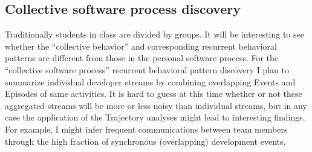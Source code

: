 \subsection{Collective software process discovery}
Traditionally students in class are divided by groups. It will be interesting to see whether the ``collective behavior'' and corresponding recurrent behavioral patterns are different from those in the personal software process. For the ``collective software process'' recurrent behavioral pattern discovery I plan to summarize individual developer streams by combining overlapping Events and Episodes of same activities. It is hard to guess at this time whether or not these aggregated streams will be more or less noisy than individual streams, but in any case the application of the Trajectory analyses might lead to interesting findings. For example, I might infer frequent communications between team members through the high fraction of synchronous (overlapping) development events.
